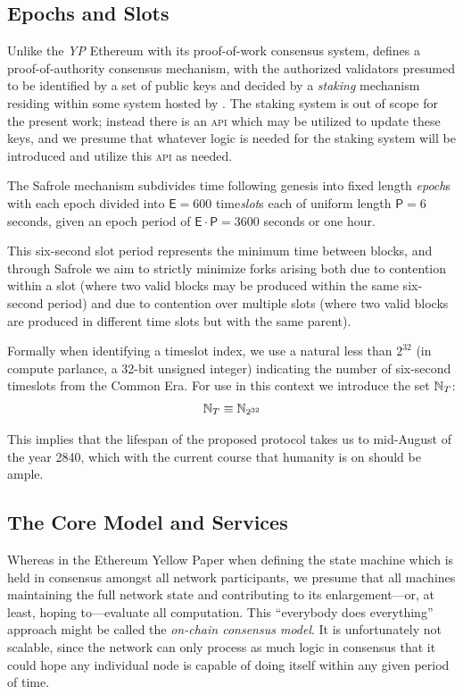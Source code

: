 \subsection{Epochs and Slots}\label{sec:epochsandslots}

Unlike the \emph{YP} Ethereum with its proof-of-work consensus system, \Jam defines a proof-of-authority consensus mechanism, with the authorized validators presumed to be identified by a set of public keys and decided by a \emph{staking} mechanism residing within some system hosted by \Jam. The staking system is out of scope for the present work; instead there is an \textsc{api} which may be utilized to update these keys, and we presume that whatever logic is needed for the staking system will be introduced and utilize this \textsc{api} as needed.

The Safrole mechanism subdivides time following genesis into fixed length \emph{epoch}s with each epoch divided into $\mathsf{E} = 600$ time\emph{slot}s each of uniform length $\mathsf{P} = 6$ seconds, given an epoch period of $\mathsf{E}\cdot\mathsf{P} = 3600$ seconds or one hour.

This six-second slot period represents the minimum time between \Jam blocks, and through Safrole we aim to strictly minimize forks arising both due to contention within a slot (where two valid blocks may be produced within the same six-second period) and due to contention over multiple slots (where two valid blocks are produced in different time slots but with the same parent).

Formally when identifying a timeslot index, we use a natural less than $2^{32}$ (in compute parlance, a 32-bit unsigned integer) indicating the number of six-second timeslots from the \Jam Common Era. For use in this context we introduce the set $\mathbb{N}_T$:
\begin{align}\label{eq:time}
  \mathbb{N}_T \equiv \mathbb{N}_{2^{32}}
\end{align}

This implies that the lifespan of the proposed protocol takes us to mid-August of the year 2840, which with the current course that humanity is on should be ample.

\subsection{The Core Model and Services}\label{sec:coremodelandservices}

Whereas in the Ethereum Yellow Paper when defining the state machine which is held in consensus amongst all network participants, we presume that all machines maintaining the full network state and contributing to its enlargement---or, at least, hoping to---evaluate all computation. This ``everybody does everything'' approach might be called the \emph{on-chain consensus model}. It is unfortunately not scalable, since the network can only process as much logic in consensus that it could hope any individual node is capable of doing itself within any given period of time.

